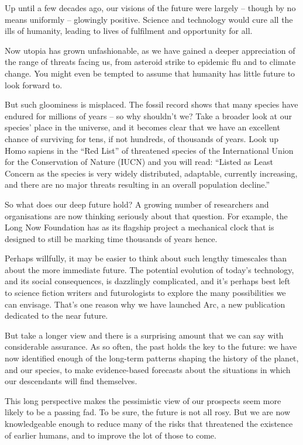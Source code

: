 Up until a few decades ago, our visions of the future were largely – though by no means uniformly – glowingly positive. Science and technology would cure all the ills of humanity, leading to lives of fulfilment and opportunity for all.


Now utopia has grown unfashionable, as we have gained a deeper appreciation of the range of threats facing us, from asteroid strike to epidemic flu and to climate change. You might even be tempted to assume that humanity has little future to look forward to.


But such gloominess is misplaced. The fossil record shows that many species have endured for millions of years – so why shouldn't we? Take a broader look at our species' place in the universe, and it becomes clear that we have an excellent chance of surviving for tens, if not hundreds, of thousands of years. Look up Homo sapiens in the ``Red List'' of threatened species of the International Union for the Conservation of Nature (IUCN) and you will read: ``Listed as Least Concern as the species is very widely distributed, adaptable, currently increasing, and there are no major threats resulting in an overall population decline.''


So what does our deep future hold? A growing number of researchers and organisations are now thinking seriously about that question. For example, the Long Now Foundation has as its flagship project a mechanical clock that is designed to still be marking time thousands of years hence.


Perhaps willfully, it may be easier to think about such lengthy timescales than about the more immediate future. The potential evolution of today's technology, and its social consequences, is dazzlingly complicated, and it's perhaps best left to science fiction writers and futurologists to explore the many possibilities we can envisage. That's one reason why we have launched Arc, a new publication dedicated to the near future.


But take a longer view and there is a surprising amount that we can say with considerable assurance. As so often, the past holds the key to the future: we have now identified enough of the long-term patterns shaping the history of the planet, and our species, to make evidence-based forecasts about the situations in which our descendants will find themselves.


This long perspective makes the pessimistic view of our prospects seem more likely to be a passing fad. To be sure, the future is not all rosy. But we are now knowledgeable enough to reduce many of the risks that threatened the existence of earlier humans, and to improve the lot of those to come.